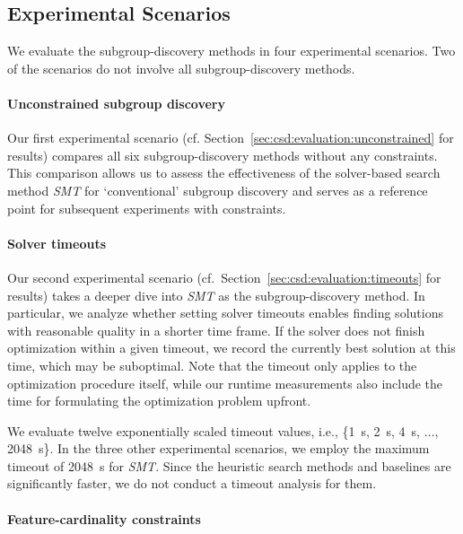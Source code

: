 \documentclass{article}
\theoremstyle{definition}
\begin{document}
\subsection{Experimental Scenarios}
\label{sec:csd:experimental-design:scenarios}

We evaluate the subgroup-discovery methods in four experimental scenarios.
Two of the scenarios do not involve all subgroup-discovery methods.

\paragraph{Unconstrained subgroup discovery}

Our first experimental scenario (cf. Section~\ref{sec:csd:evaluation:unconstrained} for results) compares all six subgroup-discovery methods without any constraints.
This comparison allows us to assess the effectiveness of the solver-based search method \emph{SMT} for `conventional' subgroup discovery and serves as a reference point for subsequent experiments with constraints.

\paragraph{Solver timeouts}

Our second experimental scenario (cf.~Section~\ref{sec:csd:evaluation:timeouts} for results) takes a deeper dive into \emph{SMT} as the subgroup-discovery method.
In particular, we analyze whether setting solver timeouts enables finding solutions with reasonable quality in a shorter time frame.
If the solver does not finish optimization within a given timeout, we record the currently best solution at this time, which may be suboptimal.
Note that the timeout only applies to the optimization procedure itself, while our runtime measurements also include the time for formulating the optimization problem upfront.

We evaluate twelve exponentially scaled timeout values, i.e., \{1~s, 2~s, 4~s, $\dots$, 2048~s\}.
In the three other experimental scenarios, we employ the maximum timeout of 2048~s for \emph{SMT}.
Since the heuristic search methods and baselines are significantly faster, we do not conduct a timeout analysis for them.

\paragraph{Feature-cardinality constraints}
\end{document}
